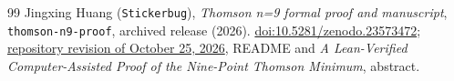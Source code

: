 \documentclass[11pt]{article}
\begin{document}
\begin{thebibliography}{99}
Jingxing Huang (\texttt{Stickerbug}),
\emph{Thomson n=9 formal proof and manuscript},
\texttt{thomson-n9-proof}, archived release (2026).
\href{https://doi.org/10.5281/zenodo.23573472}{doi:10.5281/zenodo.23573472};
\href{https://github.com/Stickerbug/thomson-n9-proof/tree/5f8492931e40e62e2064a162f978ff0e2541a2f6}{repository revision of October 25, 2026},
README and \emph{A Lean-Verified Computer-Assisted Proof of the Nine-Point Thomson Minimum}, abstract.

\end{thebibliography}
\endgroup
\end{document}
